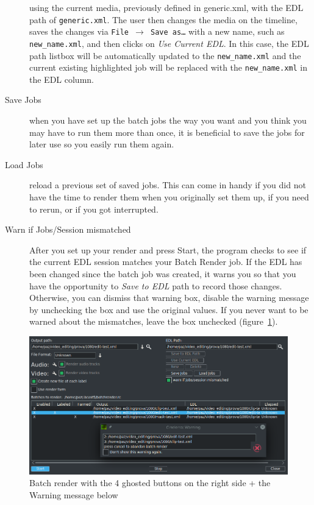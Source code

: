 \begin{description}
    using the current media, previously defined in generic.xml, with the EDL path of \texttt{generic.xml}.  The
    user then changes the media on the timeline, saves the changes via \texttt{File $\rightarrow$ Save as\dots} with a new 
    name, such as \texttt{new\_name.xml}, and then clicks on \textit{Use Current EDL}.  In this case, the EDL path
    listbox will be automatically updated to the \texttt{new\_name.xml} and the current existing highlighted job will be replaced with the \texttt{new\_name.xml} in the EDL column.
    \item[Save Jobs] when you have set up the batch jobs the way you want and you think you may have to
    run them more than once, it is beneficial to save the jobs for later use so you easily run them again.
    \item[Load Jobs] reload a previous set of saved jobs.  This can come in handy if you did not have the
    time to render them when you originally set them up, if you need to rerun, or if you got interrupted.
    \item[Warn if Jobs/Session mismatched] After you set up your render and press Start, the program checks to see if the current EDL session matches your Batch Render job.  If the EDL has
    been changed since the batch job was created, it warns you so that you have the opportunity to \textit{Save to EDL} path to record those changes.  Otherwise, you can dismiss that warning box, disable the warning message by unchecking the box and use the original values.  If you never want to be warned about the mismatches, leave the box unchecked (figure~\ref{fig:batch02}).
\end{description}

\begin{figure}[htpb]
    \centering
    \includegraphics[width=0.8\linewidth]{images/batch02.png}
    \caption{Batch render with the 4 ghosted buttons on the right side + the Warning message below}
    \label{fig:batch02}
\end{figure}

